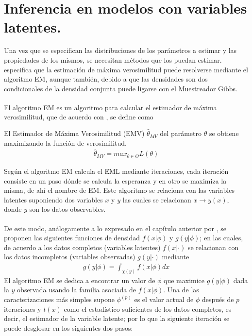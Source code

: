 \section{Inferencia en modelos con variables latentes.}
Una vez que se especifican las distribuciones de los par\'ametros a estimar y las propiedades de los mismos, se necesitan m\'etodos que los puedan estimar. \cite{pitt2002constructing} especifica que la estimaci\'on de m\'axima verosimilitud puede resolverse mediante el algoritmo EM, aunque tambi\'en, debido a que las densidades son dos condicionales de la densidad conjunta puede ligarse con el Muestreador Gibbs.\\
\\
El algoritmo EM es un algoritmo para calcular el estimador de m\'axima verosimilitud, que de acuerdo con \cite{held2014applied}, se define como
\begin{defi}
El Estimador de M\'axima Verosimilitud (EMV) $\hat{\theta}_{MV}$ del par\'ametro $\theta$ se obtiene maximizando la funci\'on de verosimilitud.
\begin{align*}
\hat{\theta}_{MV}=max_{\theta \in \Theta} L(\theta)
\end{align*} 
\end{defi}
Seg\'un \cite{dempster1977maximum} el algoritmo EM calcula el EML mediante iteraciones, cada iteraci\'on consiste en un paso d\'onde se calcula la esperanza y en otro  se maximiza la misma, de ah\'i el nombre de EM. Este algoritmo se relaciona con las variables latentes suponiendo dos variables $x$ y $y$ las cuales se relacionan $x \to y(x)$, donde $y$ son los datos observables.\\
\\
De este modo, an\'alogamente a lo expresado en el cap\'itulo anterior por \cite{pitt2002constructing}, se proponen las siguientes funciones de densidad $f(x|\phi)$ y $g(y|\phi)$; en las cuales, de acuerdo a \cite{dempster1977maximum} los datos completos (variables latentes) $f(x|\cdot)$ se relacionan con los datos incompletos (variables observadas) $g(y|\cdot)$ mediante
\begin{align*}
g(y|\phi)=\int_{\chi(y)} f(x|\phi)dx
\end{align*}
El algoritmo EM se dedica a encontrar un valor de $\phi$ que maximice $g(y|\phi)$ dada la $y$ observada usando la familia asociada de $f(x|\phi)$. Una de las caracterizaciones m\'as simples supone $\phi^{(p)}$ es el valor actual de $\phi$ despu\'es de $p$ iteraciones y $t(x)$ como el estad\'istico suficientes de los datos completos, es decir, el estimador de la variable latente; por lo que la siguiente iteraci\'on se puede desglosar en los siguientes dos pasos:
